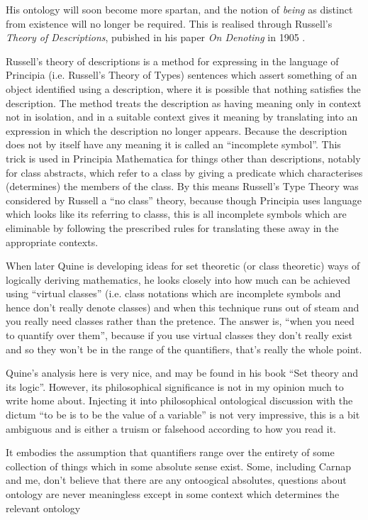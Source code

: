 \documentclass[10pt,titlepage]{article}
\begin{document}
His ontology will soon become more spartan, and the notion of {\it being} as distinct from existence will no longer be required.
This is realised through Russell's {\it Theory of Descriptions}, pubished in his paper {\it On Denoting} in 1905 \cite{russellOD}.

Russell's theory of descriptions is a method for expressing in the language of Principia (i.e. Russell's Theory of Types) sentences which assert something of an object identified using a description, where it is possible that nothing satisfies the description.
The method treats the description as having meaning only in context not in isolation, and in a suitable context gives it meaning by translating into an expression in which the description no longer appears.
Because the description does not by itself have any meaning it is called an ``incomplete symbol''.
This trick is used in Principia Mathematica for things other than descriptions, notably for class abstracts, which refer to a class by giving a predicate which characterises (determines) the members of the class.
By this means Russell's Type Theory was considered by Russell a ``no class'' theory, because though Principia uses language which looks like its referring to classs, this is all incomplete symbols which are eliminable by following the prescribed rules for translating these away in the appropriate contexts.

When later Quine is developing ideas for set theoretic (or class theoretic) ways of logically deriving mathematics, he looks closely into how much can be achieved using ``virtual classes'' (i.e. class notations which are incomplete symbols and hence don't really denote classes) and when this technique runs out of steam and you really need classes rather than the pretence.
The answer is, ``when you need to quantify over them'', because if you use virtual classes they don't really exist and so they won't be in the range of the quantifiers, that's really the whole point.

Quine's analysis here is very nice, and may be found in his book ``Set theory and its logic''\cite{quineSTAIL}.
However, its philosophical significance is not in my opinion much to write home about.
Injecting it into philosophical ontological discussion with the dictum ``to be is to be the value of a variable'' is not very impressive, this is a bit ambiguous and is either a truism or falsehood according to how you read it.

It embodies the assumption that quantifiers range over the entirety of some collection of things which in some absolute sense exist.
Some, including Carnap and me, don't believe that there are any ontoogical absolutes, questions about ontology are never meaningless except in some context which determines the relevant ontology
\end{document}
